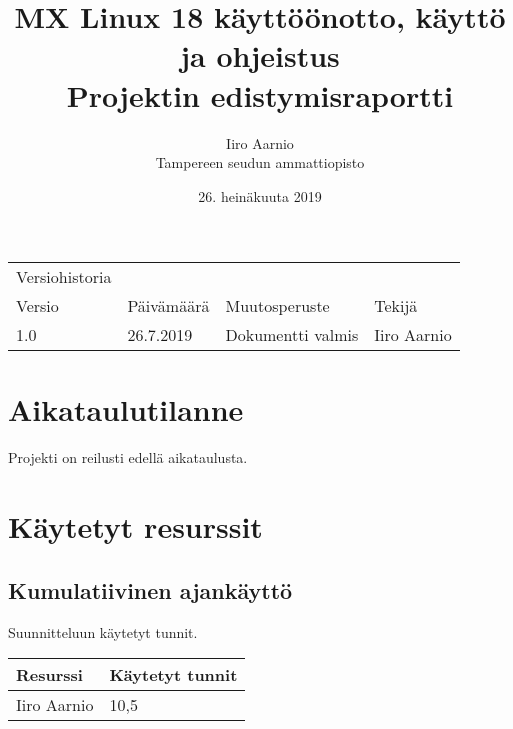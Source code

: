 \documentclass[a4paper, 12pt, finnish]{article}
\title{MX Linux 18 käyttöönotto, käyttö ja ohjeistus \\ \large Projektin edistymisraportti} %
\author{Iiro Aarnio \\ Tampereen seudun ammattiopisto \date{26. heinäkuuta 2019}}
\begin{document}
\maketitle
\thispagestyle{empty} %

\newpage
\thispagestyle{empty}
\begin{table}[htpb]
	\begin{tabular}{llll}
		Versiohistoria &            &                         &             \\
		\rowcolor[HTML]{FFCCC9}
		Versio         & Päivämäärä & Muutosperuste           & Tekijä      \\
		1.0              & 26.7.2019   & Dokumentti valmis       & Iiro Aarnio \\
	\end{tabular}
\end{table}


\newpage
\thispagestyle{empty} %

\tableofcontents

\newpage
{} %

\setcounter{page}{1} %
\newpage
\section{Aikataulutilanne}
Projekti on reilusti edellä aikataulusta. 

\section{Käytetyt resurssit}

\subsection{Kumulatiivinen ajankäyttö}
Suunnitteluun käytetyt tunnit.
\begin{table}[htpb]
\begin{tabular}{|l|l|}
\hline
Resurssi & Käytetyt tunnit \\ \hline
Iiro Aarnio & 10,5 \\ \hline
\end{tabular}%
\end{table}
\end{document}
